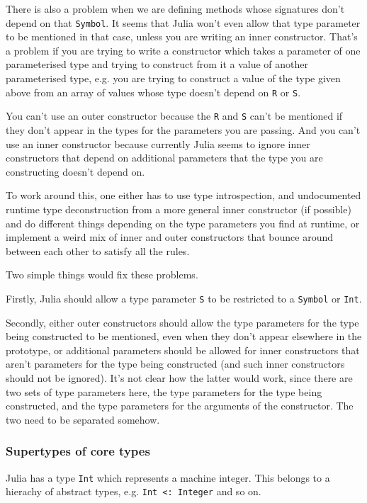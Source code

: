 \documentclass[a4paper,10pt]{article}
\newcommand{\code}{\lstinline}
\begin{document}
There is also a problem when we are defining methods whose signatures don't depend on that
\code{Symbol}. It seems that Julia won't even allow that type parameter to be mentioned in that case,
unless you are writing an inner constructor. That's a problem if you are trying to write a constructor
which takes a parameter of one parameterised type and trying to construct from it a value of another
parameterised type, e.g. you are trying to construct a value of the type given above from an array of
values whose type doesn't depend on \code{R} or \code{S}.

You can't use an outer constructor because the \code{R} and \code{S} can't be mentioned if they don't
appear in the types for the parameters you are passing. And you can't use an inner constructor because
currently Julia seems to ignore inner constructors that depend on additional parameters that the type 
you are constructing doesn't depend on.

To work around this, one either has to use type introspection, and undocumented runtime type 
deconstruction from a more general inner constructor (if possible) and do different things depending
on the type parameters you find at runtime, or implement a weird mix of inner and outer constructors
that bounce around between each other to satisfy all the rules.

Two simple things would fix these problems.

Firstly, Julia should allow a type parameter \code{S} to be restricted to a \code{Symbol} or \code{Int}.

Secondly, either outer constructors should allow the type parameters for the type being constructed to 
be mentioned, even when they don't appear elsewhere in the prototype, or additional parameters should be 
allowed for inner constructors that aren't parameters for the type being constructed (and such inner 
constructors should not be ignored). It's not clear how the latter would work, since there are two sets 
of type parameters here, the type parameters for the type being constructed, and the type parameters for
the arguments of the constructor. The two need to be separated somehow. 

\subsubsection{Supertypes of core types}

Julia has a type \code{Int} which represents a machine integer. This belongs to a hierachy of abstract
types, e.g. \code{Int <: Integer} and so on. 
\end{document}
